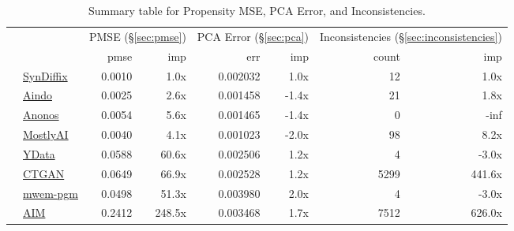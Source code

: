 \begin{table}
    \centering
    \caption{Summary table for Propensity MSE, PCA Error, and Inconsistencies.}
    \label{tab:pmse}
    \begin{tabular}{llr@{\hskip 6pt}r@{\hskip 14pt}r@{\hskip 6pt}r@{\hskip 14pt}rr}
        \toprule
          &   & \multicolumn{2}{c}{PMSE (\S\ref{sec:pmse})} & \multicolumn{2}{c}{PCA Error (\S\ref{sec:pca})} & \multicolumn{2}{c}{Inconsistencies (\S\ref{sec:inconsistencies})} \\
        
 & & pmse & imp & err & imp & count & imp \\
\midrule
        \cellcolor{blue} & \href{https://htmlpreview.github.io/?https://github.com/yoid2000/sdnist-summary/blob/main/results/syndiffix_all/report.html}{SynDiffix} & 0.0010 & 1.0x & 0.002032 & 1.0x & 12 & 1.0x \\
        \cellcolor{red} & \href{https://htmlpreview.github.io/?https://github.com/yoid2000/sdnist-summary/blob/main/results/aindo_synth/report.html}{Aindo} & 0.0025 & 2.6x & 0.001458 & -1.4x & 21 & 1.8x \\
        \cellcolor{red} & \href{https://htmlpreview.github.io/?https://github.com/yoid2000/sdnist-summary/blob/main/results/anonos_sdk/report.html}{Anonos} & 0.0054 & 5.6x & 0.001465 & -1.4x & 0 & -inf \\
        \cellcolor{red} & \href{https://htmlpreview.github.io/?https://github.com/yoid2000/sdnist-summary/blob/main/results/mostlyai_sd_platform/report.html}{MostlyAI} & 0.0040 & 4.1x & 0.001023 & -2.0x & 98 & 8.2x \\
        \cellcolor{red} & \href{https://htmlpreview.github.io/?https://github.com/yoid2000/sdnist-summary/blob/main/results/ydata_fabric_synthesizers/report.html}{YData} & 0.0588 & 60.6x & 0.002506 & 1.2x & 4 & -3.0x \\
        \cellcolor{red} & \href{https://htmlpreview.github.io/?https://github.com/yoid2000/sdnist-summary/blob/main/results/sdv_ctgan_epochs1000/report.html}{CTGAN} & 0.0649 & 66.9x & 0.002528 & 1.2x & 5299 & 441.6x \\
        \cellcolor{ForestGreen} & \href{https://htmlpreview.github.io/?https://github.com/yoid2000/sdnist-summary/blob/main/results/mwem_pgm/report.html}{mwem-pgm} & 0.0498 & 51.3x & 0.003980 & 2.0x & 4 & -3.0x \\
        \cellcolor{ForestGreen} & \href{https://htmlpreview.github.io/?https://github.com/yoid2000/sdnist-summary/blob/main/results/aim_e_10_all/report.html}{AIM} & 0.2412 & 248.5x & 0.003468 & 1.7x & 7512 & 626.0x \\

\end{tabular}
\end{table}
